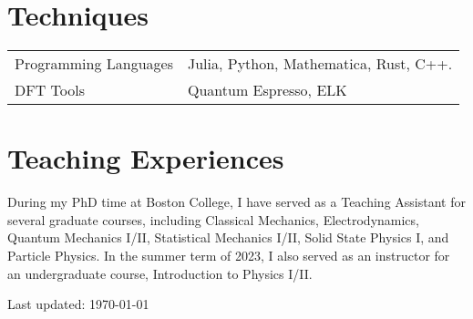 \documentclass[10pt, letterpaper]{article}
\begin{document}
\section*{Techniques}
\begin{tabular}{ll}
    Programming Languages & Julia, Python, Mathematica, Rust, C++. \\
    DFT Tools             & Quantum Espresso, ELK                  \\
\end{tabular}




\section*{Teaching Experiences}
During my PhD time at Boston College, I have served as a Teaching Assistant for several graduate courses, including Classical Mechanics, Electrodynamics, Quantum Mechanics I/II, Statistical Mechanics I/II, Solid State Physics I, and Particle Physics. In the summer term of 2023, I also served as an instructor for an undergraduate course, Introduction to Physics I/II.



\begin{center}
    \begin{footnotesize}
        Last updated: \today
    \end{footnotesize}
\end{center}
\end{document}

